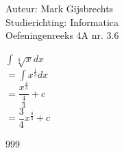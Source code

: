 \documentclass[a4paper]{article}
\newcommand{\dint}{\displaystyle\int}
\begin{document}
\noindent \large Auteur: Mark Gijsbrechts \\
\noindent \large Studierichting: Informatica\\
\noindent \large Oefeningenreeks 4A nr. 3.6\\

\medskip

\normalsize





$ \dint \sqrt[3]{x} dx $\\

$= \dint x^{\tfrac{1}{3}} dx$ \\

$= \dfrac{x^{\tfrac{4}{3}}}{\tfrac{4}{3}} + c $\\
 
$= \dfrac{3}{4} x^{\tfrac{4}{3}} + c $



\begin{thebibliography}{999}
\end{thebibliography}
\end{document}
